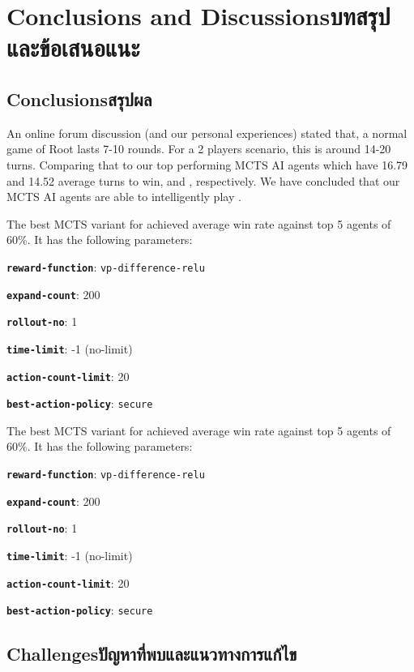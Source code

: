 \chapter{\ifenglish Conclusions and Discussions\else บทสรุปและข้อเสนอแนะ\fi}

\section{\ifenglish Conclusions\else สรุปผล\fi}

An online forum discussion (and our personal experiences) stated that, a normal game of Root lasts 7-10 rounds. For a 2 players scenario, this is around 14-20 turns. Comparing that to our top performing MCTS AI agents which have 16.79 and 14.52 average turns to win, \Marquise{} and \Eyrie{}, respectively. We have concluded that our MCTS AI agents are able to intelligently play \RootB{}.

The best MCTS variant for \Marquise{} achieved average win rate against top 5 \Eyrie{} agents of 60\%. It has the following parameters:
\item \textbf{\texttt{reward-function}}: \texttt{vp-difference-relu}
\item \textbf{\texttt{expand-count}}: 200
\item \textbf{\texttt{rollout-no}}: 1
\item \textbf{\texttt{time-limit}}: -1 (no-limit)
\item \textbf{\texttt{action-count-limit}}: 20
\item \textbf{\texttt{best-action-policy}}: \texttt{secure}

The best MCTS variant for \Eyrie{} achieved average win rate against top 5 \Marquise{} agents of 60\%. It has the following parameters:
\item \textbf{\texttt{reward-function}}: \texttt{vp-difference-relu}
\item \textbf{\texttt{expand-count}}: 200
\item \textbf{\texttt{rollout-no}}: 1
\item \textbf{\texttt{time-limit}}: -1 (no-limit)
\item \textbf{\texttt{action-count-limit}}: 20
\item \textbf{\texttt{best-action-policy}}: \texttt{secure}

\section{\ifenglish Challenges\else ปัญหาที่พบและแนวทางการแก้ไข\fi}

